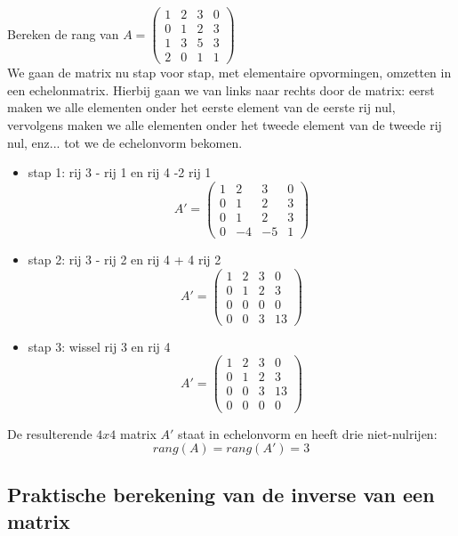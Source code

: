 \begin{voorbeeld}
	Bereken de rang van $A=\left( \begin{matrix}
1 & 2 & 3 & 0 \\
0 & 1 & 2 & 3 \\
1 & 3 & 5 & 3 \\
2 & 0 & 1 & 1
\end{matrix} \right) $\\

We gaan de matrix nu stap voor stap, met elementaire opvormingen, omzetten in een echelonmatrix. Hierbij gaan we van links naar rechts door de matrix: eerst maken we alle elementen onder het eerste element van de eerste rij nul, vervolgens maken we alle elementen onder het tweede element van de tweede rij nul, enz... tot we de echelonvorm bekomen.\\

\begin{itemize}
	\item stap 1: rij 3 - rij 1 en rij 4 -2 rij 1 
	\[ A'=\left( \begin{matrix}
	1 & 2 & 3 & 0 \\
	0 & 1 & 2 & 3 \\
	0 & 1 & 2 & 3 \\
	0 & -4 & -5 & 1 \end{matrix} \right) \] 
	\item stap 2: rij 3 - rij 2 en rij 4 + 4 rij 2
	\[ A'=\left( \begin{matrix}
	1 & 2 & 3 & 0 \\
	0 & 1 & 2 & 3 \\
	0 & 0 & 0 & 0 \\
	0 & 0 & 3 & 13 \end{matrix} \right) \]
	\item stap 3: wissel rij 3 en rij 4 
	\[ A'=\left( \begin{matrix}
	1 & 2 & 3 & 0 \\
	0 & 1 & 2 & 3 \\
	0 & 0 & 3 & 13 \\
	0 & 0 & 0 & 0 \end{matrix} \right) \]
\end{itemize}

De resulterende $4x4$ matrix $A'$ staat in echelonvorm en heeft drie niet-nulrijen: 
\[ rang(A)=rang(A')=3 \]

\end{voorbeeld}

\subsection{Praktische berekening van de inverse van een matrix}

